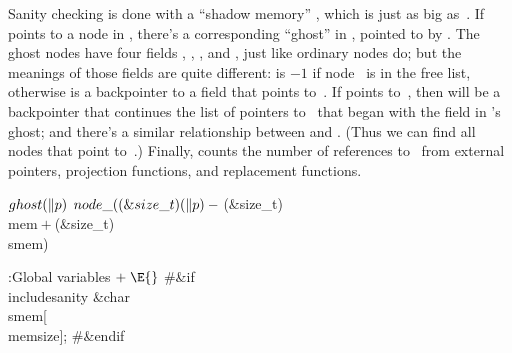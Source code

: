 Sanity checking is done with a ``shadow memory'' , which is
just
as big as~. If  points to a node in , there's a
corresponding
``ghost'' in , pointed to by . The ghost
nodes have four
fields , , , and , just like
ordinary nodes do; but the
meanings of those fields are quite different:  is $-1$ if
node~
is in the free list, otherwise  is a backpointer to a
field
that points to~. If  points to~, then  will be
a backpointer that continues the list of pointers to~ that began
with the  field in 's ghost; and there's a similar
relationship
between  and . (Thus we can find all
nodes that point to~.)
Finally,  counts the number of references to~
from external
pointers, projection functions, and replacement functions.

\Y\B\4\D$\\{ghost}(\|p)$ \5
$\\{node\_}((\&{size\_t})(\|p)-{}$(\&{size\_t}) \\{mem}${}+{}$(\&{size\_t}) %
\\{smem})\par
\Y\B\4:Global variables\X${}\mathrel+\E{}$\6
\8\#\&{if} \\{includesanity}\6
\&{char} \\{smem}[\\{memsize}];\6
\8\#\&{endif}\par
\fi


